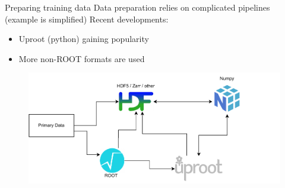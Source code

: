 \documentclass[aspectratio=169,9pt]{beamer}
\begin{document}
\begin{frame}[t]{Preparing training data}
  Data preparation relies on complicated pipelines (example is simplified)
  \vspace*{1em}
  Recent developments:
  \begin{itemize}
    \item Uproot (python) gaining popularity
    \item More non-ROOT formats are used
  \end{itemize}
  \vspace*{-2em}
  \begin{figure}
    \centering
    \includegraphics[width=.7\textwidth]{making_dataset.drawio.pdf}
  \end{figure}
\end{frame}
\end{document}
